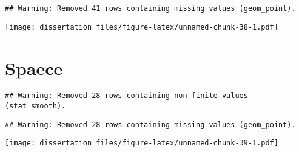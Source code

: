 \documentclass[12pt,]{book}
\newenvironment{Shaded}{\begin{snugshade}}{\end{snugshade}}
\newcommand{\DataTypeTok}[1]{\textcolor[rgb]{0.13,0.29,0.53}{#1}}
\newcommand{\DecValTok}[1]{\textcolor[rgb]{0.00,0.00,0.81}{#1}}
\newcommand{\KeywordTok}[1]{\textcolor[rgb]{0.13,0.29,0.53}{\textbf{#1}}}
\newcommand{\NormalTok}[1]{#1}
\newcommand{\OperatorTok}[1]{\textcolor[rgb]{0.81,0.36,0.00}{\textbf{#1}}}
\newcommand{\StringTok}[1]{\textcolor[rgb]{0.31,0.60,0.02}{#1}}
\begin{document}
\begin{verbatim}
## Warning: Removed 41 rows containing missing values (geom_point).
\end{verbatim}

\texttt{[image: dissertation\_files/figure-latex/unnamed-chunk-38-1.pdf]}

\hypertarget{spaece}{%
\section{Spaece}\label{spaece}}

\begin{Shaded}
\end{Shaded}

\begin{verbatim}
## Warning: Removed 28 rows containing non-finite values (stat_smooth).
\end{verbatim}

\begin{verbatim}
## Warning: Removed 28 rows containing missing values (geom_point).
\end{verbatim}

\texttt{[image: dissertation\_files/figure-latex/unnamed-chunk-39-1.pdf]}

\begin{Shaded}
\end{Shaded}
\end{document}
